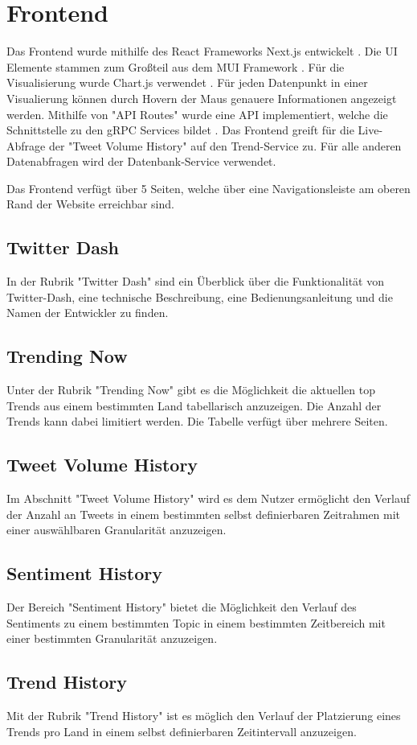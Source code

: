 \documentclass[conference]{IEEEtran}
\begin{document}
\section{Frontend}
Das Frontend wurde mithilfe des React Frameworks Next.js entwickelt \cite{nextjs}. 
Die UI Elemente stammen zum Großteil aus dem MUI Framework \cite{mui}.
Für die Visualisierung wurde Chart.js verwendet \cite{chartjs}.
Für jeden Datenpunkt in einer Visualierung können durch Hovern der Maus genauere Informationen angezeigt werden.
Mithilfe von "API Routes" wurde eine API implementiert, welche die Schnittstelle zu den gRPC Services bildet \cite{apiroutes}. 
Das Frontend greift für die Live-Abfrage der "Tweet Volume History" auf den Trend-Service zu.
Für alle anderen Datenabfragen wird der Datenbank-Service verwendet.

Das Frontend verfügt über 5 Seiten, welche über eine Navigationsleiste am oberen Rand der Website erreichbar sind.

\subsection*{Twitter Dash}
In der Rubrik "Twitter Dash" sind ein Überblick über die Funktionalität von Twitter-Dash, 
eine technische Beschreibung, eine Bedienungsanleitung und die Namen der Entwickler zu finden.
\subsection*{Trending Now}
Unter der Rubrik "Trending Now" gibt es die Möglichkeit die aktuellen top Trends aus einem bestimmten Land tabellarisch anzuzeigen.
Die Anzahl der Trends kann dabei limitiert werden. Die Tabelle verfügt über mehrere Seiten.
\subsection*{Tweet Volume History}
Im Abschnitt "Tweet Volume History" wird es dem Nutzer ermöglicht den Verlauf der Anzahl an Tweets in einem bestimmten selbst definierbaren Zeitrahmen 
mit einer auswählbaren Granularität anzuzeigen.
\subsection*{Sentiment History}
Der Bereich "Sentiment History" bietet die Möglichkeit den Verlauf des Sentiments zu einem bestimmten Topic in einem bestimmten Zeitbereich mit einer bestimmten Granularität anzuzeigen.
\subsection*{Trend History}
Mit der Rubrik "Trend History" ist es möglich den Verlauf der Platzierung eines Trends pro Land in einem selbst definierbaren Zeitintervall anzuzeigen.
\end{document}
